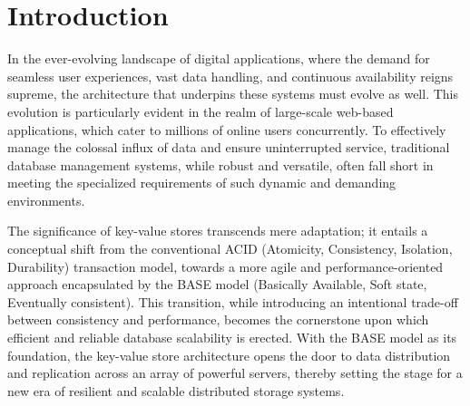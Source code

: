 \documentclass[sigconf]{acmart}
\begin{document}


\maketitle

\section{Introduction}

In the ever-evolving landscape of digital applications, where the demand for seamless user experiences, vast data handling, and continuous availability reigns supreme, the architecture that underpins these systems must evolve as well. This evolution is particularly evident in the realm of large-scale web-based applications, which cater to millions of online users concurrently. To effectively manage the colossal influx of data and ensure uninterrupted service, traditional database management systems, while robust and versatile, often fall short in meeting the specialized requirements of such dynamic and demanding environments.

The significance of key-value stores transcends mere adaptation; it entails a conceptual shift from the conventional ACID (Atomicity, Consistency, Isolation, Durability) transaction model, towards a more agile and performance-oriented approach encapsulated by the BASE model (Basically Available, Soft state, Eventually consistent). This transition, while introducing an intentional trade-off between consistency and performance, becomes the cornerstone upon which efficient and reliable database scalability is erected. With the BASE model as its foundation, the key-value store architecture opens the door to data distribution and replication across an array of powerful servers, thereby setting the stage for a new era of resilient and scalable distributed storage systems.
\end{document}
